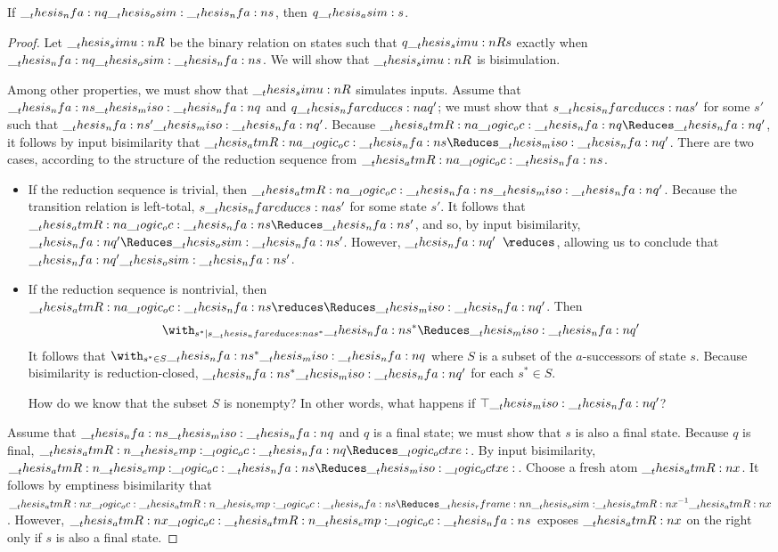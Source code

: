 \begin{theorem}
  If $\__thesis_nfa:n {q} \__thesis_osim: \__thesis_nfa:n {s}$, then $q \__thesis_asim: s$.
\end{theorem}
%
\begin{proof}
  Let $\__thesis_simu:n {R}$ be the binary relation on states such that $q \__thesis_simu:n {R} s$ exactly when $\__thesis_nfa:n {q} \__thesis_osim: \__thesis_nfa:n {s}$.
  We will show that $\__thesis_simu:n {R}$ is  bisimulation.

  Among other properties, we must show that $\__thesis_simu:n {R}$ simulates inputs.
  Assume that $\__thesis_nfa:n {s} \__thesis_miso: \__thesis_nfa:n {q}$ and $q \nfareduces[a] q'$; we must show that $s \nfareduces[a] s'$ for some $s'$ such that $\__thesis_nfa:n {s}' \__thesis_miso: \__thesis_nfa:n {q}'$.
  Because $\atmR{a} \oc \nfa{q} \Reduces \nfa{q}'$, it follows by input bisimilarity that $\atmR{a} \oc \nfa{s} \Reduces\miso \nfa{q}'$.
  There are two cases, according to the structure of the reduction sequence from $\__thesis_atmR:n {a} \__logic_oc: \__thesis_nfa:n {s}$.
  \begin{itemize}
  \item If the reduction sequence is trivial, then $\__thesis_atmR:n {a} \__logic_oc: \__thesis_nfa:n {s} \__thesis_miso: \__thesis_nfa:n {q}'$.
    Because the transition relation is left-total, $s \nfareduces[a] s'$ for some state $s'$.
    It follows that $\atmR{a} \oc \nfa{s} \Reduces \nfa{s}'$, and so, by input bisimilarity, $\nfa{q}' \Reduces\osim \nfa{s}'$.
    However, $\nfa{q}' \longarrownot\reduces$, allowing us to conclude that $\__thesis_nfa:n {q}' \__thesis_osim: \__thesis_nfa:n {s}'$.
  \item If the reduction sequence is nontrivial, then $\atmR{a} \oc \nfa{s} \reduces\Reduces\miso \nfa{q}'$.
    Then
    \begin{equation*}
      \with_{s^* \mid s \nfareduces[a] s^*} \nfa{s}^* \Reduces\miso \nfa{q}'
    \end{equation*}
    It follows that $\with_{s^* \in S} \nfa{s}^* \miso \nfa{q}$ where $S$ is a subset of the $a$-successors of state $s$.
    Because bisimilarity is reduction-closed, $\__thesis_nfa:n {s}^* \__thesis_miso: \__thesis_nfa:n {q}'$ for each $s^* \in S$.

    How do we know that the subset $S$ is nonempty?
    In other words, what happens if $\top \__thesis_miso: \__thesis_nfa:n {q}'$?
  \end{itemize}

  Assume that $\__thesis_nfa:n {s} \__thesis_miso: \__thesis_nfa:n {q}$ and $q$ is a final state;
  we must show that $s$ is also a final state.
  Because $q$ is final, $\atmR{\emp} \oc \nfa{q} \Reduces \octxe$.
  By input bisimilarity, $\atmR{\emp} \oc \nfa{s} \Reduces\miso \octxe$.
  Choose a fresh atom $\__thesis_atmR:n {x}$.
  It follows by emptiness bisimilarity that $\atmR{x} \oc \atmR{\emp} \oc \nfa{s} \Reduces\rframe{\osim}{\atmR{x}}^{-1} \atmR{x}$.
  However, $\__thesis_atmR:n {x} \__logic_oc: \__thesis_atmR:n {\__thesis_emp:} \__logic_oc: \__thesis_nfa:n {s}$ exposes $\__thesis_atmR:n {x}$ on the right only if $s$ is also a final state.
\end{proof}

